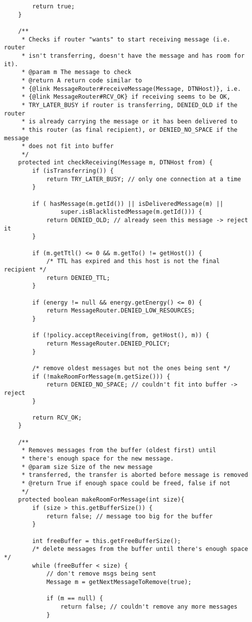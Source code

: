 \documentclass[11pt]{icsthesis}
\begin{document}
\begin{framed}
\begin{verbatim}
		return true;
	}
	
	/**
	 * Checks if router "wants" to start receiving message (i.e. router 
	 * isn't transferring, doesn't have the message and has room for it).
	 * @param m The message to check
	 * @return A return code similar to 
	 * {@link MessageRouter#receiveMessage(Message, DTNHost)}, i.e. 
	 * {@link MessageRouter#RCV_OK} if receiving seems to be OK, 
	 * TRY_LATER_BUSY if router is transferring, DENIED_OLD if the router
	 * is already carrying the message or it has been delivered to
	 * this router (as final recipient), or DENIED_NO_SPACE if the message
	 * does not fit into buffer
	 */
	protected int checkReceiving(Message m, DTNHost from) {
		if (isTransferring()) {
			return TRY_LATER_BUSY; // only one connection at a time
		}
	
		if ( hasMessage(m.getId()) || isDeliveredMessage(m) ||
				super.isBlacklistedMessage(m.getId())) {
			return DENIED_OLD; // already seen this message -> reject it
		}
		
		if (m.getTtl() <= 0 && m.getTo() != getHost()) {
			/* TTL has expired and this host is not the final recipient */
			return DENIED_TTL; 
		}

		if (energy != null && energy.getEnergy() <= 0) {
			return MessageRouter.DENIED_LOW_RESOURCES;
		}
		
		if (!policy.acceptReceiving(from, getHost(), m)) {
			return MessageRouter.DENIED_POLICY;
		}
		
		/* remove oldest messages but not the ones being sent */
		if (!makeRoomForMessage(m.getSize())) {
			return DENIED_NO_SPACE; // couldn't fit into buffer -> reject
		}
		
		return RCV_OK;
	}
	
	/** 
	 * Removes messages from the buffer (oldest first) until
	 * there's enough space for the new message.
	 * @param size Size of the new message 
	 * transferred, the transfer is aborted before message is removed
	 * @return True if enough space could be freed, false if not
	 */
	protected boolean makeRoomForMessage(int size){
		if (size > this.getBufferSize()) {
			return false; // message too big for the buffer
		}
			
		int freeBuffer = this.getFreeBufferSize();
		/* delete messages from the buffer until there's enough space */
		while (freeBuffer < size) {
            // don't remove msgs being sent
			Message m = getNextMessageToRemove(true);

			if (m == null) {
				return false; // couldn't remove any more messages
			}			
			

\end{verbatim}
\end{framed}
\end{document}
